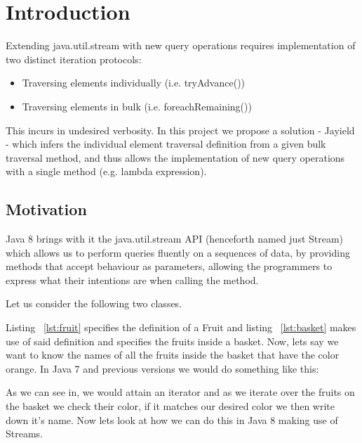 \chapter{Introduction}
Extending java.util.stream with new query operations requires implementation of two distinct iteration protocols:
\begin{itemize}
\item Traversing elements individually (i.e. tryAdvance())
\item Traversing elements in bulk (i.e. foreachRemaining())
\end{itemize}
This incurs in undesired verbosity. In this project we propose a solution - Jayield - which infers the individual element traversal definition from a given bulk traversal method, and thus allows the implementation of new query operations with a single method (e.g. lambda expression).


\section{Motivation}

Java 8 brings with it the java.util.stream API (henceforth named just Stream) which allows us to perform queries fluently on a sequences of data, by providing methods that accept behaviour as parameters, allowing the programmers to express what their intentions are when calling the method.

\newpage
Let us consider the following two classes.



Listing ~\ref{lst:fruit} specifies the definition of a Fruit and listing ~\ref{lst:basket} makes use of said definition and specifies the fruits inside a basket. Now, lets say we want to know the names of all the fruits inside the basket that have the color orange. In Java 7 and previous versions we would do something like this:



\newpage
As we can see in, we would attain an iterator and as we iterate over the fruits on the basket we check their color, if it matches our desired color we then write down it's name. Now lets look at how we can do this in Java 8 making use of Streams.

